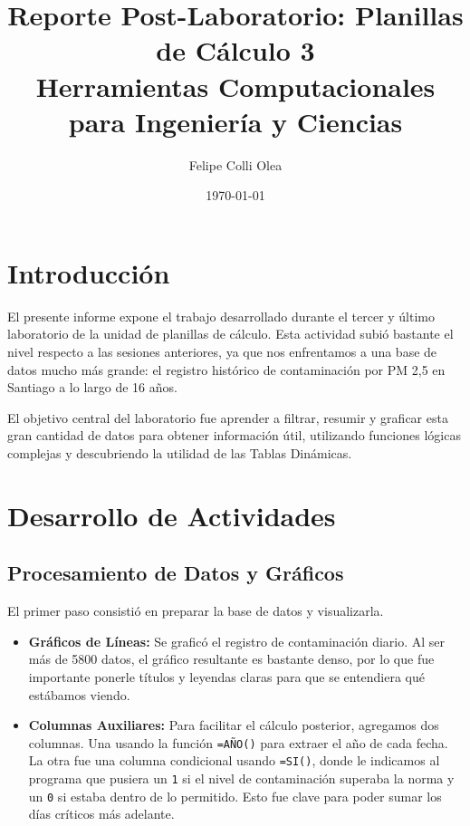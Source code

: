 \documentclass[11pt]{article}
\title{Reporte Post-Laboratorio: Planillas de Cálculo 3 \\ \large{Herramientas Computacionales para Ingeniería y Ciencias}}
\author{Felipe Colli Olea}
\date{\today}
\begin{document}
\maketitle
\thispagestyle{fancy}

\section{Introducción}

El presente informe expone el trabajo desarrollado durante el tercer y último laboratorio de la unidad de planillas de cálculo. Esta actividad subió bastante el nivel respecto a las sesiones anteriores, ya que nos enfrentamos a una base de datos mucho más grande: el registro histórico de contaminación por PM 2,5 en Santiago a lo largo de 16 años.

El objetivo central del laboratorio fue aprender a filtrar, resumir y graficar esta gran cantidad de datos para obtener información útil, utilizando funciones lógicas complejas y descubriendo la utilidad de las Tablas Dinámicas.

\section{Desarrollo de Actividades}

\subsection{Procesamiento de Datos y Gráficos}
El primer paso consistió en preparar la base de datos y visualizarla.

\begin{itemize}
	\item \textbf{Gráficos de Líneas:} Se graficó el registro de contaminación diario. Al ser más de 5800 datos, el gráfico resultante es bastante denso, por lo que fue importante ponerle títulos y leyendas claras para que se entendiera qué estábamos viendo.

	\item \textbf{Columnas Auxiliares:} Para facilitar el cálculo posterior, agregamos dos columnas. Una usando la función \texttt{=AÑO()} para extraer el año de cada fecha. La otra fue una columna condicional usando \texttt{=SI()}, donde le indicamos al programa que pusiera un \texttt{1} si el nivel de contaminación superaba la norma y un \texttt{0} si estaba dentro de lo permitido. Esto fue clave para poder sumar los días críticos más adelante.
\end{itemize}
\end{document}
